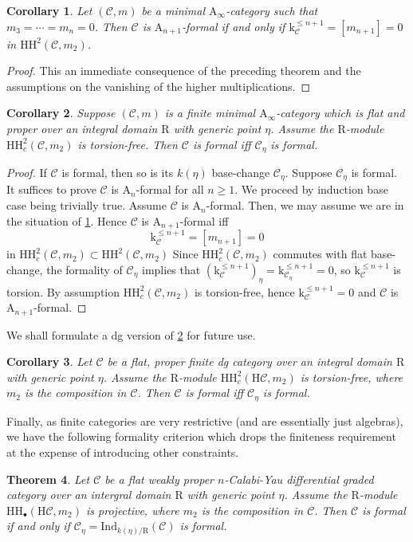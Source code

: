 \documentclass{article}
\theoremstyle{plain}
\newtheorem{theorem}{Theorem}[subsection]   %
\newtheorem{corollary}[theorem]{Corollary}
\theoremstyle{definition}
\theoremstyle{remark}
\newcommand{\mr}{\mathrm}
\newcommand{\Aa}{\mr{A}_{\infty}}
\newcommand{\Cc}{\mathcal C}
\newcommand{\3}{\vspace{3mm}}
\newcommand{\2}{\vspace{2mm}}
\newcommand{\1}{\vspace{1mm}}
\begin{document}
\begin{corollary}\label{a2kaledin}
Let $(\Cc,m)$ be a minimal $\Aa$-category such that $m_3=\cdots=m_n=0$. Then $\Cc$ is $\mr{A}_{n+1}$-formal if and only if $\mr{k}_{\Cc}^{\le n+1}=[m_{n+1}]=0$ in $\mr{HH}^2(\Cc,m_2)$.
\end{corollary}
\begin{proof}
This an immediate consequence of the preceding theorem and the assumptions on the vanishing of the higher multiplications.
\end{proof}
\begin{corollary}\label{a2generic}
Suppose $(\Cc,m)$ is a finite minimal $\Aa$-category which is flat and proper over an integral domain $\mr{R}$ with generic point $\eta$. Assume the $\mr{R}$-module $\mr{HH}^2_c(\Cc,m_2)$ is torsion-free. Then $\Cc$ is formal iff $\Cc_\eta$ is formal.
\end{corollary}
\begin{proof}
If $\Cc$ is formal, then so is its $k(\eta)$ base-change $\Cc_\eta$. Suppose $\Cc_\eta$ is formal. It suffices to prove $\Cc$ is $\mr{A}_n$-formal for all $n\ge 1$. We proceed by induction base case being trivially true. Assume $\Cc$ is $\mr{A}_n$-formal. Then, we may assume we are in the situation of \cref{a2kaledin}. Hence $\Cc$ is $\mr{A}_{n+1}$-formal iff $$\mr{k}_{\Cc}^{\le n+1}=[m_{n+1}]=0$$ in $\mr{HH}^{2}_c(\Cc,m_2)\subset\mr{HH}^2(\Cc,m_2)$ Since $\mr{HH}_c^2(\Cc,m_2)$ commutes with flat base-change, the formality of $\Cc_\eta$ implies that $\left(\mr{k}_{\Cc}^{\le n+1}\right)_\eta=\mr{k}_{\Cc_\eta}^{\le n+1}=0$, so $\mr{k}_{\Cc}^{\le n+1}$ is torsion. By assumption $\mr{HH}^2_c(\Cc,m_2)$ is torsion-free, hence $\mr{k}_{\Cc}^{\le n+1}=0$ and $\Cc$ is $\mr{A}_{n+1}$-formal.
\end{proof}
We shall formulate a dg version of \cref{a2generic} for future use.
\2
\begin{corollary}\label{a2dg}
Let $\Cc$ be a flat, proper finite dg category over an integral domain $\mr{R}$ with generic point $\eta$. Assume the $\mr{R}$-module $\mr{HH}^2_c(\mr{H}\Cc,m_2)$ is torsion-free, where $m_2$ is the composition in $\Cc$. Then $\Cc$ is formal iff $\Cc_\eta$ is formal.
\end{corollary}
Finally, as finite categories are very restrictive (and are essentially just algebras), we have the following formality criterion which drops the finiteness requirement at the expense of introducing other constraints.
\2
\begin{theorem}\label{a2cy}
Let $\Cc$ be a flat weakly proper $n$-Calabi-Yau differential graded category over an intergral domain $\mr{R}$ with generic point $\eta$. Assume the $\mr{R}$-module $\mr{HH}_\bullet(\mr{H}\Cc,m_2)$ is projective, where $m_2$ is the composition in $\Cc$. Then $\Cc$ is formal if and only if $\Cc_\eta=\mr{Ind}_{k(\eta)/\mr{R}}(\Cc)$ is formal.
\end{theorem}
\end{document}
